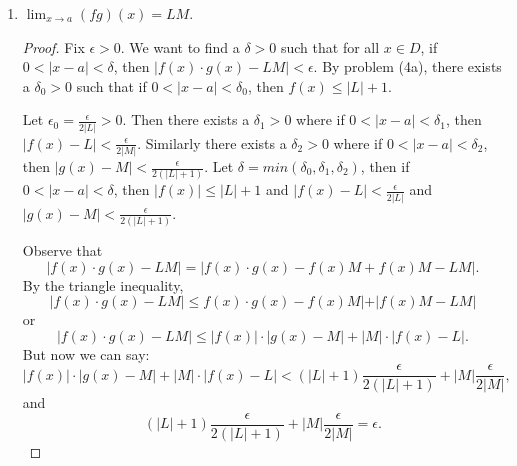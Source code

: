 \documentclass[12pt]{amsart}
\begin{document}
\begin{enumerate}
\begin{enumerate}

\item $\displaystyle \lim_{x\rightarrow a} (fg)(x) = LM$.

\begin{proof}
Fix $\epsilon > 0$. We want to find a $\delta >0$ such that for all $x\in D$, if $0<|x-a|<\delta$, then $| f(x) \cdot g(x) - LM| < \epsilon$. By problem (4a), there exists a $\delta_0>0$ such that if $0<|x-a|<\delta_0$, then $f(x) \le |L|+1$.

Let $\epsilon_0 = \tfrac \epsilon {2 |L|} > 0$. Then there exists a $\delta_1>0$ where if $0<|x-a|<\delta_1$, then $|f(x) - L| < \tfrac \epsilon {2 |M|}$. Similarly there exists a $\delta_2>0$ where if $0<|x-a|<\delta_2$, then $|g(x) - M| < \tfrac \epsilon {2 (|L|+1)}$. Let $\delta = min( \delta_0, \delta_1, \delta_2)$, then if $0< |x-a| < \delta$, then $|f(x)| \le |L|+1$ and $| f(x) - L| < \tfrac \epsilon {2 |L|}$ and $| g(x) - M| < \tfrac \epsilon {2(|L|+1)}$.

Observe that
%
\[ | f(x) \cdot g(x) - LM | = | f(x) \cdot g(x) - f(x)M + f(x)M - LM |. \]
%
By the triangle inequality,
%
\[  | f(x) \cdot g(x) - LM | \le  f(x) \cdot g(x) - f(x)M| + |f(x)M - LM| \]
%
or
%
\[  | f(x) \cdot g(x) - LM | \le  |f(x)| \cdot |g(x) - M| + |M| \cdot |f(x) - L|. \]
But now we can say:
%
\[ |f(x)| \cdot |g(x) - M| + |M| \cdot |f(x) - L| < (|L|+1) \frac \epsilon {2(|L|+1)} + |M| \frac \epsilon {2|M|}, \]
%
and
%
\[ (|L|+1) \frac \epsilon {2(|L|+1)} + |M| \frac \epsilon {2|M|} = \epsilon. \]
\end{proof}

%

  \end{enumerate}

%



\end{enumerate}
\end{document}
